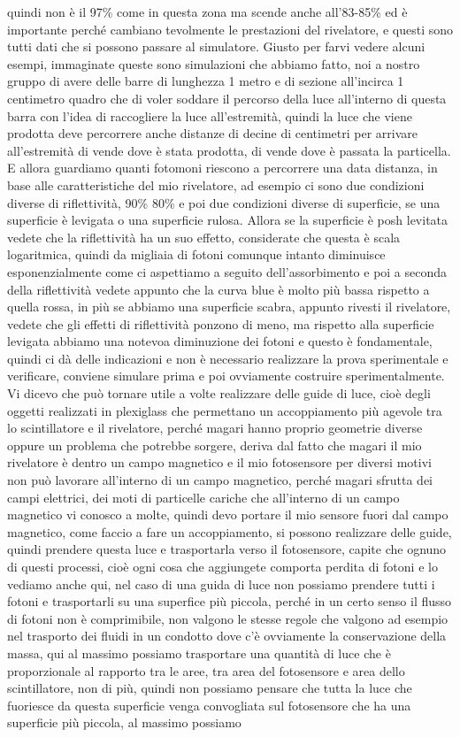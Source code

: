 {quindi non è il 97\% come in questa zona ma scende anche all'83-85\% ed è importante perché cambiano tevolmente le prestazioni del rivelatore, e questi sono tutti dati che si possono passare al simulatore. Giusto per farvi vedere alcuni esempi, immaginate queste sono simulazioni che abbiamo fatto, noi a nostro gruppo di avere delle barre di lunghezza 1 metro e di sezione all'incirca 1 centimetro quadro che di voler soddare il percorso della luce all'interno di questa barra con l'idea di raccogliere la luce all'estremità, quindi la luce che viene prodotta deve percorrere anche distanze di decine di centimetri per arrivare all'estremità di vende dove è stata prodotta, di vende dove è passata la particella. E allora guardiamo quanti fotomoni riescono a percorrere una data distanza, in base alle caratteristiche del mio rivelatore, ad esempio ci sono due condizioni diverse di riflettività, 90\% 80\% e poi due condizioni diverse di superficie, se una superficie è levigata o una superficie rulosa. Allora se la superficie è posh levitata vedete che la riflettività ha un suo effetto, considerate che questa è scala logaritmica, quindi da migliaia di fotoni comunque intanto diminuisce esponenzialmente come ci aspettiamo a seguito dell'assorbimento e poi a seconda della riflettività vedete appunto che la curva blue è molto più bassa rispetto a quella rossa, in più se abbiamo una superficie scabra, appunto rivesti il rivelatore, vedete che gli effetti di riflettività ponzono di meno, ma rispetto alla superficie levigata abbiamo una notevoa diminuzione dei fotoni e questo è fondamentale, quindi ci dà delle indicazioni e non è necessario realizzare la prova sperimentale e verificare, conviene simulare prima e poi ovviamente costruire sperimentalmente. Vi dicevo che può tornare utile a volte realizzare delle guide di luce, cioè degli oggetti realizzati in plexiglass che permettano un accoppiamento più agevole tra lo scintillatore e il rivelatore, perché magari hanno proprio geometrie diverse oppure un problema che potrebbe sorgere, deriva dal fatto che magari il mio rivelatore è dentro un campo magnetico e il mio fotosensore per diversi motivi non può lavorare all'interno di un campo magnetico, perché magari sfrutta dei campi elettrici, dei moti di particelle cariche che all'interno di un campo magnetico vi conosco a molte, quindi devo portare il mio sensore fuori dal campo magnetico, come faccio a fare un accoppiamento, si possono realizzare delle guide, quindi prendere questa luce e trasportarla verso il fotosensore, capite che ognuno di questi processi, cioè ogni cosa che aggiungete comporta perdita di fotoni e lo vediamo anche qui, nel caso di una guida di luce non possiamo prendere tutti i fotoni e trasportarli su una superfice più piccola, perché in un certo senso il flusso di fotoni non è comprimibile, non valgono le stesse regole che valgono ad esempio nel trasporto dei fluidi in un condotto dove c'è ovviamente la conservazione della massa, qui al massimo possiamo trasportare una quantità di luce che è proporzionale al rapporto tra le aree, tra area del fotosensore e area dello scintillatore, non di più, quindi non possiamo pensare che tutta la luce che fuoriesce da questa superficie venga convogliata sul fotosensore che ha una superficie più piccola, al massimo possiamo }
